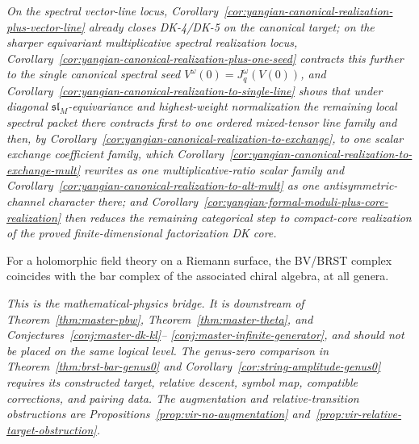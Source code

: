 \begin{conjecture}
\emph{On the spectral vector-line locus,
Corollary~\ref{cor:yangian-canonical-realization-plus-vector-line}
already closes DK-4/DK-5 on the canonical target; on the sharper
equivariant multiplicative spectral realization locus,
Corollary~\ref{cor:yangian-canonical-realization-plus-one-seed}
contracts this further to the single canonical spectral seed
\(V^\omega(0)=J_q^\omega(V(0))\), and
Corollary~\ref{cor:yangian-canonical-realization-to-single-line}
shows that under diagonal \(\mathfrak{sl}_M\)-equivariance and
highest-weight normalization the remaining local spectral packet there
contracts first to one ordered mixed-tensor line family and then, by
Corollary~\ref{cor:yangian-canonical-realization-to-exchange}, to one
scalar exchange coefficient family, which
Corollary~\ref{cor:yangian-canonical-realization-to-exchange-mult}
rewrites as one multiplicative-ratio scalar family and
Corollary~\ref{cor:yangian-canonical-realization-to-alt-mult} as one
antisymmetric-channel character there; and
Corollary~\ref{cor:yangian-formal-moduli-plus-core-realization}
then reduces the remaining categorical step to compact-core
realization of the proved finite-dimensional factorization DK core.}
\end{conjecture}

\begin{conjecture}
\label{conj:master-bv-brst}
\ClaimStatusConjectured{}
For a holomorphic field theory on a Riemann surface, the BV/BRST
complex coincides with the bar complex of the associated chiral algebra,
at all genera.

\emph{This is the mathematical-physics bridge.  It is
downstream of Theorem~\textup{\ref{thm:master-pbw}},
Theorem~\textup{\ref{thm:master-theta}}, and
Conjectures~\textup{\ref{conj:master-dk-kl}}--\textup{%
\ref{conj:master-infinite-generator}}, and should not be placed on the
same logical level. The genus-zero comparison in Theorem~\ref{thm:brst-bar-genus0} and Corollary~\ref{cor:string-amplitude-genus0} requires its constructed target, relative descent, symbol map, compatible corrections, and pairing data.
The augmentation and relative-transition obstructions are Propositions~\ref{prop:vir-no-augmentation} and~\ref{prop:vir-relative-target-obstruction}.}
\end{conjecture}


